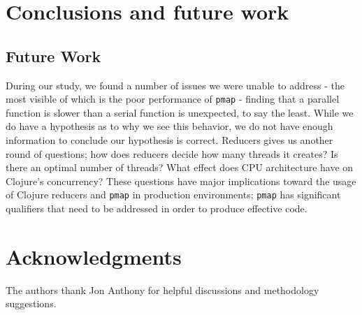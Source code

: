 \documentclass[12pt]{article}
\newcommand{\clocode}[1]{{\texttt {#1}}}
\begin{document}

\section{Conclusions and future work}\label{sec:conclusion}




\subsection{Future Work}\label{sec:future}
During our study, we found a number of issues we were unable to address - the most visible of which is the poor performance of \clocode{pmap} - finding that a parallel function is slower than a serial function is unexpected, to say the least. While we do have a hypothesis as to why we see this behavior, we do not have enough information to conclude our hypothesis is correct. Reducers gives us another round of questions; how does reducers decide how many threads it creates? Is there an optimal number of threads? What effect does CPU architecture have on Clojure's concurrency?	
These questions have major implications toward the usage of Clojure reducers and \clocode{pmap} in production environments; \clocode{pmap} has significant qualifiers that need to be addressed in order to produce effective code.

\section{Acknowledgments} 
The authors thank Jon Anthony for helpful discussions and methodology suggestions. 




%
%




%  
%
%










\end{document}
